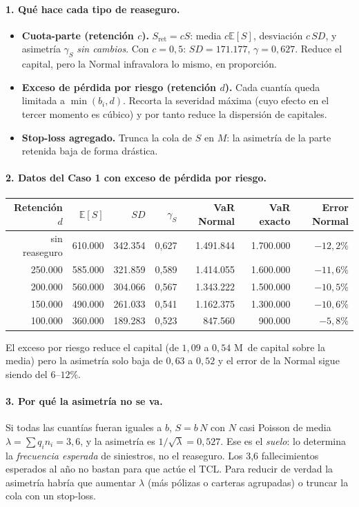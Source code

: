 \documentclass[a4paper,12pt]{article}
\newcommand{\euro}{\texteuro}
\newcommand{\E}{\mathbb{E}}
\begin{document}
\paragraph{1. Qu\'e hace cada tipo de reaseguro.}
\begin{itemize}[leftmargin=*,itemsep=1pt]
\item \textbf{Cuota-parte (retenci\'on $c$).} $S_{\text{ret}}=cS$: media $c\E[S]$, desviaci\'on $c\,SD$, y asimetr\'ia $\gamma_S$ \emph{sin cambios}. Con $c=0{,}5$: $SD=171.177$, $\gamma=0{,}627$. Reduce el capital, pero la Normal infravalora lo mismo, en proporci\'on.
\item \textbf{Exceso de p\'erdida por riesgo (retenci\'on $d$).} Cada cuant\'ia queda limitada a $\min(b_i,d)$. Recorta la severidad m\'axima (cuyo efecto en el tercer momento es c\'ubico) y por tanto reduce la dispersi\'on de capitales.
\item \textbf{Stop-loss agregado.} Trunca la cola de $S$ en $M$: la asimetr\'ia de la parte retenida baja de forma dr\'astica.
\end{itemize}

\paragraph{2. Datos del Caso 1 con exceso de p\'erdida por riesgo.}
\begin{center}
\begin{tabular}{rrrrrrr}
\toprule
Retenci\'on $d$ & $\E[S]$ & $SD$ & $\gamma_S$ & VaR Normal & VaR exacto & Error Normal\\
\midrule
sin reaseguro & 610.000 & 342.354 & 0,627 & 1.491.844 & 1.700.000 & $-12{,}2\%$\\
250.000 & 585.000 & 321.859 & 0,589 & 1.414.055 & 1.600.000 & $-11{,}6\%$\\
200.000 & 560.000 & 304.066 & 0,567 & 1.343.222 & 1.500.000 & $-10{,}5\%$\\
150.000 & 490.000 & 261.033 & 0,541 & 1.162.375 & 1.300.000 & $-10{,}6\%$\\
100.000 & 360.000 & 189.283 & 0,523 & 847.560 & 900.000 & $-5{,}8\%$\\
\bottomrule
\end{tabular}
\end{center}
El exceso por riesgo reduce el capital (de $1,09$ a $0,54$ M\euro\ de capital sobre la media) pero la asimetr\'ia solo baja de $0{,}63$ a $0{,}52$ y el error de la Normal sigue siendo del $6$--$12\%$.

\paragraph{3. Por qu\'e la asimetr\'ia no se va.} Si todas las cuant\'ias fueran iguales a $b$, $S=b\,N$ con $N$ casi Poisson de media $\lambda=\sum q_in_i=3{,}6$, y la asimetr\'ia es $1/\sqrt\lambda=0{,}527$. Ese es el \emph{suelo}: lo determina la \emph{frecuencia esperada} de siniestros, no el reaseguro. Los 3,6 fallecimientos esperados al a\~no no bastan para que act\'ue el TCL. Para reducir de verdad la asimetr\'ia habr\'ia que aumentar $\lambda$ (m\'as p\'olizas o carteras agrupadas) o truncar la cola con un stop-loss.
\end{document}
